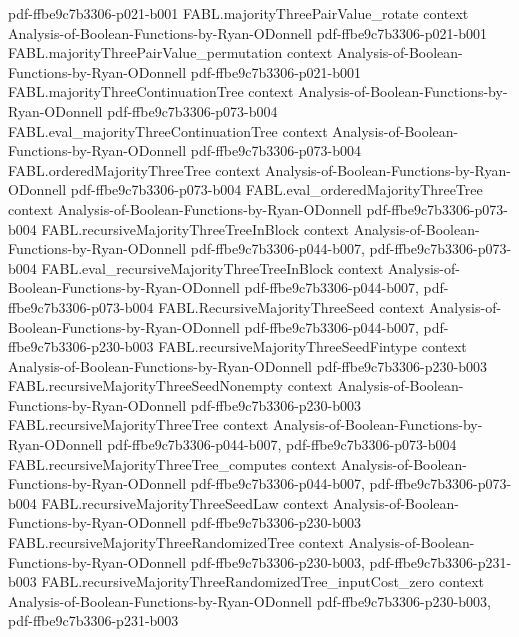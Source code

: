 \begin{theorem}
  {pdf-ffbe9c7b3306-p021-b001}
\proofstep
  {FABL.majorityThreePairValue_rotate}
  {context}
  {Analysis-of-Boolean-Functions-by-Ryan-ODonnell}
  {pdf-ffbe9c7b3306-p021-b001}
\proofstep
  {FABL.majorityThreePairValue_permutation}
  {context}
  {Analysis-of-Boolean-Functions-by-Ryan-ODonnell}
  {pdf-ffbe9c7b3306-p021-b001}
\proofstep
  {FABL.majorityThreeContinuationTree}
  {context}
  {Analysis-of-Boolean-Functions-by-Ryan-ODonnell}
  {pdf-ffbe9c7b3306-p073-b004}
\proofstep
  {FABL.eval_majorityThreeContinuationTree}
  {context}
  {Analysis-of-Boolean-Functions-by-Ryan-ODonnell}
  {pdf-ffbe9c7b3306-p073-b004}
\proofstep
  {FABL.orderedMajorityThreeTree}
  {context}
  {Analysis-of-Boolean-Functions-by-Ryan-ODonnell}
  {pdf-ffbe9c7b3306-p073-b004}
\proofstep
  {FABL.eval_orderedMajorityThreeTree}
  {context}
  {Analysis-of-Boolean-Functions-by-Ryan-ODonnell}
  {pdf-ffbe9c7b3306-p073-b004}
\proofstep
  {FABL.recursiveMajorityThreeTreeInBlock}
  {context}
  {Analysis-of-Boolean-Functions-by-Ryan-ODonnell}
  {pdf-ffbe9c7b3306-p044-b007,
    pdf-ffbe9c7b3306-p073-b004}
\proofstep
  {FABL.eval_recursiveMajorityThreeTreeInBlock}
  {context}
  {Analysis-of-Boolean-Functions-by-Ryan-ODonnell}
  {pdf-ffbe9c7b3306-p044-b007,
    pdf-ffbe9c7b3306-p073-b004}
\proofstep
  {FABL.RecursiveMajorityThreeSeed}
  {context}
  {Analysis-of-Boolean-Functions-by-Ryan-ODonnell}
  {pdf-ffbe9c7b3306-p044-b007,
    pdf-ffbe9c7b3306-p230-b003}
\proofstep
  {FABL.recursiveMajorityThreeSeedFintype}
  {context}
  {Analysis-of-Boolean-Functions-by-Ryan-ODonnell}
  {pdf-ffbe9c7b3306-p230-b003}
\proofstep
  {FABL.recursiveMajorityThreeSeedNonempty}
  {context}
  {Analysis-of-Boolean-Functions-by-Ryan-ODonnell}
  {pdf-ffbe9c7b3306-p230-b003}
\proofstep
  {FABL.recursiveMajorityThreeTree}
  {context}
  {Analysis-of-Boolean-Functions-by-Ryan-ODonnell}
  {pdf-ffbe9c7b3306-p044-b007,
    pdf-ffbe9c7b3306-p073-b004}
\proofstep
  {FABL.recursiveMajorityThreeTree_computes}
  {context}
  {Analysis-of-Boolean-Functions-by-Ryan-ODonnell}
  {pdf-ffbe9c7b3306-p044-b007,
    pdf-ffbe9c7b3306-p073-b004}
\proofstep
  {FABL.recursiveMajorityThreeSeedLaw}
  {context}
  {Analysis-of-Boolean-Functions-by-Ryan-ODonnell}
  {pdf-ffbe9c7b3306-p230-b003}
\proofstep
  {FABL.recursiveMajorityThreeRandomizedTree}
  {context}
  {Analysis-of-Boolean-Functions-by-Ryan-ODonnell}
  {pdf-ffbe9c7b3306-p230-b003,
    pdf-ffbe9c7b3306-p231-b003}
\proofstep
  {FABL.recursiveMajorityThreeRandomizedTree_inputCost_zero}
  {context}
  {Analysis-of-Boolean-Functions-by-Ryan-ODonnell}
  {pdf-ffbe9c7b3306-p230-b003,
    pdf-ffbe9c7b3306-p231-b003}

\end{theorem}
